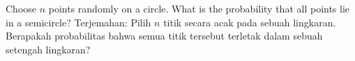 Choose $n$ points randomly on a circle. What is the probability that all points lie in a semicircle?
Terjemahan: Pilih $n$ titik secara acak pada sebuah lingkaran. Berapakah probabilitas bahwa semua titik tersebut terletak dalam sebuah setengah lingkaran?